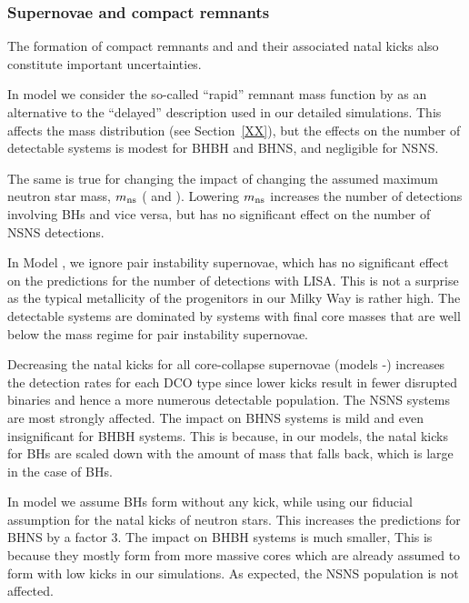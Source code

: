\subsubsection{Supernovae and compact remnants}

The formation of compact remnants and and their associated natal kicks also constitute important uncertainties.  

In model \modRapid{} we consider the so-called ``rapid'' remnant mass function by \citet{Fryer+2015} as an alternative to the ``delayed'' description used in our detailed simulations. This affects the mass distribution (see Section~\ref{XX}), but the effects on the number of detectable systems is modest for BHBH and BHNS, and negligible for NSNS.  

The same is true for changing the impact of changing the assumed maximum neutron star mass, $m_{\rm ns}$ (\modNSLow{} and \modNSHigh{}). Lowering $m_{\rm ns}$  increases the number of detections involving BHs and vice versa, but has no significant effect on the number of NSNS detections. 

In Model \modNoPISN{}, we ignore pair instability supernovae, which has no significant effect on the predictions for the number of detections with LISA. This is not a surprise as the typical metallicity of the progenitors in our Milky Way is rather high.  The detectable systems are dominated by systems with final core masses that are well below the mass regime for pair instability supernovae.  

Decreasing the natal kicks for all core-collapse supernovae (models \modSigLow{}-\modSigLower{}) increases the detection rates for each DCO type since lower kicks result in fewer disrupted binaries and hence a more numerous detectable population. The NSNS systems are most strongly affected.   The impact on BHNS systems is mild and even insignificant for BHBH systems. This is because, in our models, the natal kicks for BHs are scaled down with the amount of mass that falls back, which is large in the case of BHs.  

In model \modNoBH{} we assume BHs form without any kick, while using our fiducial assumption for the natal kicks of neutron stars.  This increases the predictions for BHNS by a factor 3. The impact on BHBH systems is much smaller, This is because they mostly form from more massive cores which are already assumed to form with low kicks in our simulations.  As expected, the NSNS population is not affected. 



